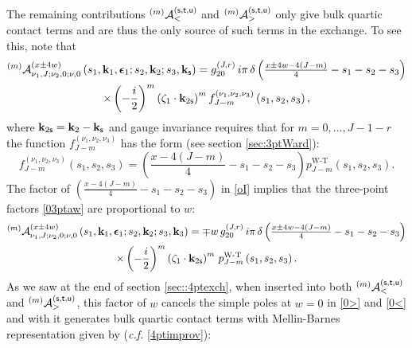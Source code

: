 \documentclass[11pt,a4paper]{article}
\begin{document}
The remaining contributions ${}^{\left(m\right)}{\cal A}^{\left({\sf s}, {\sf t}, {\sf u}\right)}_{<}$ and ${}^{\left(m\right)}{\cal A}^{\left({\sf s}, {\sf t}, {\sf u}\right)}_{>}$ only give bulk quartic contact terms and are thus the only source of such terms in the exchange. To see this, note that 
\begin{multline}\label{03ptaw}
    {}^{\left(m\right)}{\cal A}^{\left(x\pm4w\right)}_{\nu_1,J;\nu_2,0;\nu,0}\left(s_{1},{\bf k}_{1},\boldsymbol{\epsilon}_{1};s_{2},{\bf k}_{2};s_3,{\bf k}_{\sf s}\right)= g^{\left(J,r\right)}_{20}\, i \pi\, \delta\left(\tfrac{x\pm 4w-4\left(J-m\right)}{4}-s_1-s_2-s_3\right)\\ \times \left(-\frac{i}{2}\right)^m \left(\zeta_1 \cdot {\bf k}_{2{\sf s}}\right)^m f^{\left(\nu_1,\nu_2,\nu_3\right)}_{J-m}\left(s_1,s_2,s_3\right),
\end{multline}
where ${\bf k}_{2{\sf s}} = {\bf k}_{2}-{\bf k}_{\sf s}$ and gauge invariance requires that for $m=0, \ldots, J-1-r$ the function $f^{\left(\nu_1,\nu_2,\nu_3\right)}_{J-m}$ has the form (see section \ref{sec:3ptWard}):
\begin{equation}\label{oI}
    f^{\left(\nu_1,\nu_2,\nu_3\right)}_{J-m}\left(s_1,s_2,s_3\right)= \left(\frac{x-4\left(J-m\right)}{4}-s_1-s_2-s_3\right)p^{\text{W-T}}_{J-m}\left(s_1,s_2,s_3\right).
\end{equation}
 The factor of $\left(\frac{x-4\left(J-m\right)}{4}-s_1-s_2-s_3\right)$ in \eqref{oI} implies that the three-point factors \eqref{03ptaw} are proportional to $w$:
\begin{multline}
    {}^{\left(m\right)}{\cal A}^{\left(x\pm4w\right)}_{\nu_1,J;\nu_2,0;\nu,0}\left(s_{1},{\bf k}_{1},\boldsymbol{\epsilon}_{1};s_{2},{\bf k}_{2};s_3,{\bf k}_3\right)=\mp w\,g^{\left(J,r\right)}_{20}\, i \pi\, \delta\left(\tfrac{x\pm 4w-4\left(J-m\right)}{4}-s_1-s_2-s_3\right) \\ \times \left(-\frac{i}{2}\right)^m \left(\zeta_1 \cdot {\bf k}_{2{\sf s}}\right)^m\,p^{\text{W-T}}_{J-m}\left(s_1,s_2,s_3\right).
\end{multline}
As we saw at the end of section \ref{sec::4ptexch}, when inserted into both ${}^{\left(m\right)}{\cal A}^{\left({\sf s}, {\sf t}, {\sf u}\right)}_{<}$ and ${}^{\left(m\right)}{\cal A}^{\left({\sf s}, {\sf t}, {\sf u}\right)}_{>}$, this factor of $w$ cancels the simple poles at $w=0$ in \eqref{0>} and \eqref{0<} and with it generates bulk quartic contact terms with Mellin-Barnes representation given by (\emph{c.f.} \eqref{4ptimprov}):
\end{document}
